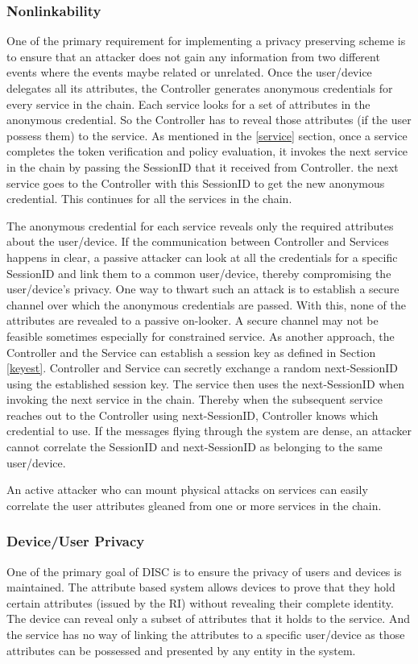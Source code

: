 \documentclass[journal]{IEEEtran}
\begin{document}
\subsubsection{Nonlinkability}
One of the primary requirement for implementing a privacy preserving scheme is to ensure that an attacker does not gain any information from two different events where the events maybe related or unrelated. Once the user/device delegates all its attributes, the Controller generates anonymous credentials for every service in the chain. Each service looks for a set of attributes in the anonymous credential. So the Controller has to reveal those attributes (if the user possess them) to the service. As mentioned in the \ref{service} section, once a service completes the token verification and policy evaluation, it invokes the next service in the chain by passing the SessionID that it received from Controller. the next service goes to the Controller with this SessionID to get the new anonymous credential. This continues for all the services in the chain.

The anonymous credential for each service reveals only the required attributes about the user/device. If the communication between Controller and Services happens in clear, a passive attacker can look at all the credentials for a specific SessionID and link them to a common user/device, thereby compromising the user/device's privacy. One way to thwart such an attack is to establish a secure channel over which the anonymous credentials are passed. With this, none of the attributes are revealed to a passive on-looker. A secure channel may not be feasible sometimes especially for constrained service. As another approach, the Controller and the Service can establish a session key as defined in Section \ref{keyest}. Controller and Service can secretly exchange a random next-SessionID using the established session key. The service then uses the next-SessionID when invoking the next service in the chain.  Thereby when the subsequent service reaches out to the Controller using next-SessionID, Controller knows which credential to use. If the messages flying through the system are dense, an attacker cannot correlate the SessionID and next-SessionID as belonging to the same user/device.

An active attacker who can mount physical attacks on services can easily correlate the user attributes gleaned from one or more services in the chain.

\subsubsection{Device/User Privacy}
One of the primary goal of DISC is to ensure the privacy of users and devices is maintained. The attribute based system allows devices to prove that they hold certain attributes (issued by the RI) without revealing their complete identity. The device can reveal only a subset of attributes that it holds to the service. And the service has no way of linking the attributes to a specific user/device as those attributes can be possessed and presented by any entity in the system.
 
\end{document}
